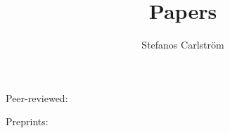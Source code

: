 \documentclass{article}
\title{Papers}
\author{Stefanos Carlström}
\begin{document}
\maketitle

Peer-reviewed:
\cite{Lorek2014RoSI,Petersson2016,Heyl2014,Larsen2016,Carlstroem2016,Carlstroem2018,Carlstroem2016a,Guo2018,Carlstroem2022tdcisI,Carlstroem2022tdcisII,Carlstroem2022coherence,Weissenbilder2022,Nandi2022,Wikmark2019,Olofsson2021,Heyl2022,Cheng2020,Bertolino2022,Carlstroem2023linspinpol,Nandi2024,Nie2024,Tahouri2024,Carlstroem2025,Andrade2025,Zhang2025,Flores2026,Ouahioune2026,Rivera-Dean2026,Volkov2026,Eichmann2026}

Preprints:
\cite{Varillas2026,Flores2025,Carlstroem2026surff,Carlstroem2026spinmigration}

\printbibliography
\end{document}
